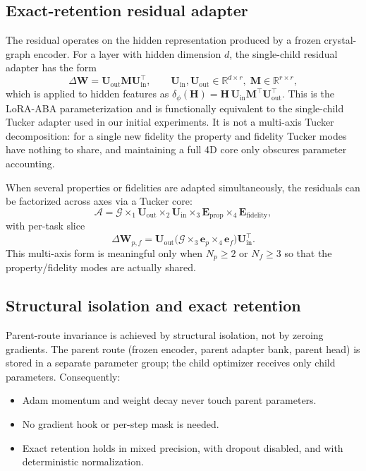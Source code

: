 \documentclass{article}
\theoremstyle{plain}
\theoremstyle{definition}
\theoremstyle{remark}
\begin{document}
\subsection{Exact-retention residual adapter}

The residual operates on the hidden representation produced by a frozen crystal-graph encoder. For a layer with hidden dimension $d$, the single-child residual adapter has the form
\begin{equation}
\Delta \mathbf W = \mathbf U_{\mathrm{out}} \mathbf M \mathbf U_{\mathrm{in}}^{\!\top},
\qquad
\mathbf U_{\mathrm{in}},\mathbf U_{\mathrm{out}}\in\mathbb R^{d\times r},
\;\mathbf M\in\mathbb R^{r\times r},
\label{eq:single-child-adapter}
\end{equation}
which is applied to hidden features as $\delta_\phi(\mathbf H)=\mathbf H\,\mathbf U_{\mathrm{in}}\mathbf M^{\!\top}\mathbf U_{\mathrm{out}}^{\!\top}$. This is the LoRA-ABA parameterization and is functionally equivalent to the single-child Tucker adapter used in our initial experiments. It is not a multi-axis Tucker decomposition: for a single new fidelity the property and fidelity Tucker modes have nothing to share, and maintaining a full 4D core only obscures parameter accounting.

When several properties or fidelities are adapted simultaneously, the residuals can be factorized across axes via a Tucker core:
\begin{equation}
\mathcal A = \mathcal G \times_1 \mathbf U_{\mathrm{out}} \times_2 \mathbf U_{\mathrm{in}} \times_3 \mathbf E_{\mathrm{prop}} \times_4 \mathbf E_{\mathrm{fidelity}},
\end{equation}
with per-task slice
\begin{equation}
\Delta \mathbf W_{p,f} = \mathbf U_{\mathrm{out}} \bigl(\mathcal G \times_3 \mathbf e_p \times_4 \mathbf e_f\bigr) \mathbf U_{\mathrm{in}}^{\!\top}.
\end{equation}
This multi-axis form is meaningful only when $N_p\ge 2$ or $N_f\ge 3$ so that the property/fidelity modes are actually shared.

\subsection{Structural isolation and exact retention}

Parent-route invariance is achieved by structural isolation, not by zeroing gradients. The parent route (frozen encoder, parent adapter bank, parent head) is stored in a separate parameter group; the child optimizer receives only child parameters. Consequently:
\begin{itemize}[leftmargin=*]
    \item Adam momentum and weight decay never touch parent parameters.
    \item No gradient hook or per-step mask is needed.
    \item Exact retention holds in mixed precision, with dropout disabled, and with deterministic normalization.
\end{itemize}
\end{document}
